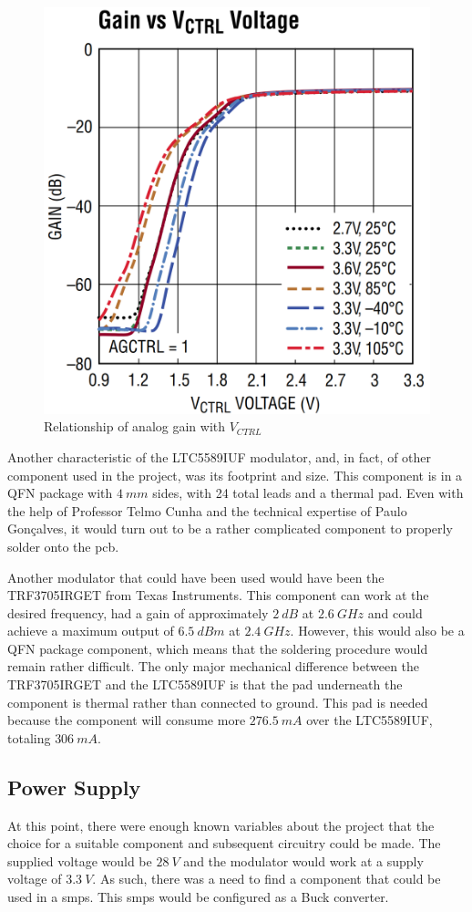 \begin{figure}[H]
    \vspace*{0cm}
    \centering
    \includegraphics[width=0.6\linewidth]{figs/ch3_GainVCTRLquadmod.png}
    \caption{Relationship of analog gain with $V_{CTRL}$ \cite{LTC5589}}
    \label{fig:ch3_GainVCTRLquadmod.png}
\end{figure}

\par Another characteristic of the LTC5589IUF modulator, and, in fact, of other component used in the project, was its footprint and size. This component is in a QFN package with $4 \:\si{mm}$ sides, with 24 total leads and a thermal pad. Even with the help of Professor Telmo Cunha and the technical expertise of Paulo Gonçalves, it would turn out to be a rather complicated component to properly solder onto the \ac{pcb}. 

\par Another modulator that could have been used would have been the TRF3705IRGET from Texas Instruments. This component can work at the desired frequency, had a gain of approximately $2 \:\si{dB}$ at $2.6 \:\si{GHz}$ and could achieve a maximum output of $6.5 \:\si{dBm}$ at $2.4 \:\si{GHz}$. However, this would also be a QFN package component, which means that the soldering procedure would remain rather difficult. The only major mechanical difference between the TRF3705IRGET and the LTC5589IUF is that the pad underneath the component is thermal rather than connected to ground. This pad is needed because the component will consume more $276.5 \:\si{mA}$ over the LTC5589IUF, totaling $306 \:\si{mA}$.

\subsection{Power Supply} 
\par At this point, there were enough known variables about the project that the choice for a suitable component and subsequent circuitry could be made. The supplied voltage would be $28 \:\si{V}$ and the modulator would work at a supply voltage of $3.3 \:\si{V}$. As such, there was a need to find a component that could be used in a \ac{smps}. This \ac{smps} would be configured as a Buck converter.

